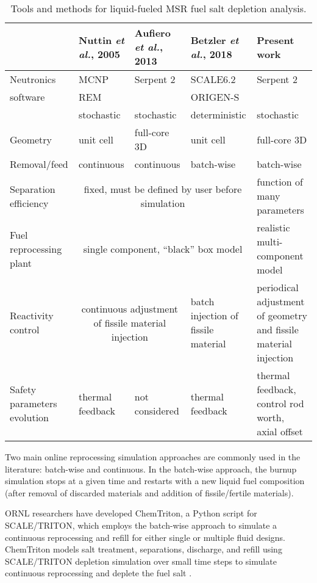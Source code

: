 \begin{table}[htbp]
	\fontsize{9}{11}\selectfont
	\caption{Tools and methods for liquid-fueled \gls{MSR} fuel salt 	
	depletion analysis.}
	\begin{tabularx}{\textwidth}{p{} p{} 	
	p{} p{} p{}} 
	\hline
	&Nuttin \emph{et al.}, 2005 \cite{nuttin_potential_2005}& Aufiero 
	\emph{et al.}, 2013 \cite{aufiero_extended_2013} & Betzler \emph{et al.}, 
	2018 \cite{betzler_fuel_2018}&Present work \\ \hline
	Neutronics&\gls{MCNP}&Serpent 2 &SCALE6.2     &Serpent 2 \\
	software  & REM      &          &ORIGEN-S     &			       \\
         	  &stochastic&stochastic&deterministic&stochastic      \\[10pt]
	Geometry  & unit cell& full-core 3D&unit cell&full-core 3D\\      [10pt]
	Removal/feed  & continuous &continuous & batch-wise & batch-wise\\[10pt]
	Separation efficiency &\multicolumn{3}{c}{fixed, must be defined by 
	user before simulation} & function of many para\-me\-ters \\ [10pt]
	Fuel reprocessing plant & \multicolumn{3}{c}{single component, 	``black'' 
	box model} & realistic multi-compo\-nent model \\ [10pt]
	Reactivity control & \multicolumn{2}{c}{continuous adjustment of fissile 
	material injection} & batch injection of fissile material & periodical 
		adjustment of geometry and fissile material injection\\ [10pt]
	Safety parameters evolution & thermal feedback & not considered & thermal 
	feedback & thermal feedback, control rod worth, axial offset \\
	\hline
	\end{tabularx}
	\label{tab:msr_codes}
\end{table}

Two main online reprocessing simulation approaches are commonly used in the 
literature: batch-wise and continuous. In the batch-wise approach, the burnup 
simulation stops at a given time and restarts with a new liquid fuel 
composition (after removal of discarded materials and addition of 
fissile/fertile materials). 

\gls{ORNL} researchers have developed ChemTriton, a Python script for
SCALE/TRITON, which employs the batch-wise approach to simulate a continuous 
reprocessing and refill for either single or multiple fluid designs.  
ChemTriton models salt treatment, separations, discharge, and refill using  
SCALE/TRITON depletion simulation over small time steps to simulate continuous 
reprocessing and deplete the fuel salt \cite{betzler_fuel_2018, 
powers_new_2013}.

